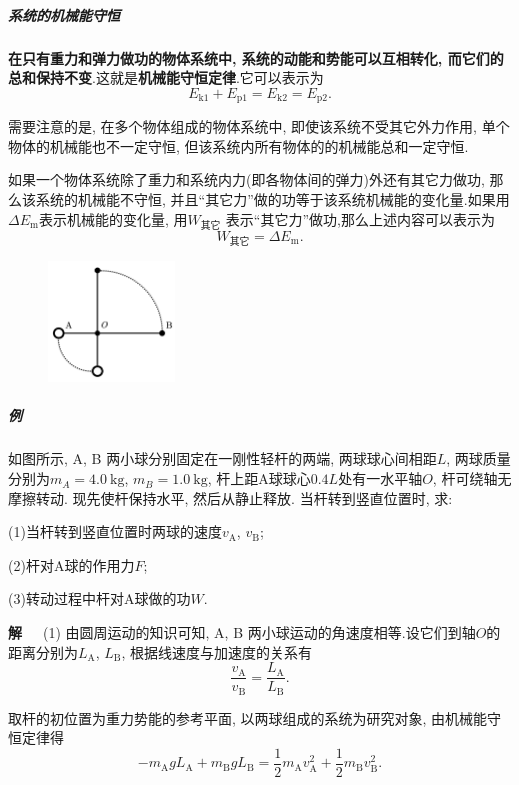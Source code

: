 \documentclass[11pt,a4paper]{ctexart}
\newcounter{exam}[section]
\begin{document}
\subparagraph{系统的机械能守恒}\textbf{在只有重力和弹力做功的物体系统中, 系统的动能和势能可以互相转化,
	而它们的总和保持不变}.这就是\textbf{机械能守恒定律}.它可以表示为
$$E_\mathrm{k1}+E_\mathrm{p1} = E_\mathrm{k2} = E_\mathrm{p2}.$$

需要注意的是, 在多个物体组成的物体系统中, 即使该系统不受其它外力作用,
单个物体的机械能也不一定守恒, 但该系统内所有物体的的机械能总和一定守恒.

如果一个物体系统除了重力和系统内力(即各物体间的弹力)外还有其它力做功, 那么该系统的机械能不守恒,
并且``其它力''做的功等于该系统机械能的变化量.如果用$\Delta E_\mathrm{m}$表示机械能的变化量, 用$W_\text{其它}$
表示``其它力''做功,那么上述内容可以表示为$$W_\text{其它}= \Delta E_\mathrm{m}.$$

\begin{figure}
	\flushright
	\includegraphics[width=0.3\textwidth]{pic/exam_5.6-2.pdf}
	\label{fic13}
\end{figure}

\subparagraph{例\theexam}如图所示, A, B 两小球分别固定在一刚性轻杆的两端, 两球球心间相距$L$, 两球质量分别为$m_A = 4.0\ \mathrm{kg}$,
$m_B = 1.0\ \mathrm{kg}$,
杆上距A球球心$0.4L$处有一水平轴$O$, 杆可绕轴无摩擦转动. 现先使杆保持水平, 然后从静止释放. 当杆转到竖直位置时, 求:

(1)当杆转到竖直位置时两球的速度$v_\mathrm{A}$, $v_\mathrm{B}$;

(2)杆对A球的作用力$F$;

(3)转动过程中杆对A球做的功$W$.

\textbf{解}\ \ \ (1) 由圆周运动的知识可知, A, B 两小球运动的角速度相等.设它们到轴$O$的距离分别为$L_\mathrm{A}$,
$L_\mathrm{B}$, 根据线速度与加速度的关系有$$\frac{v_\mathrm{A}}{v_\mathrm{B}} = \frac{L_\mathrm{A}}{L_\mathrm{B}}.$$
\setlength{\abovedisplayskip}{5pt}
\setlength{\belowdisplayskip}{10pt}

取杆的初位置为重力势能的参考平面, 以两球组成的系统为研究对象, 由机械能守恒定律得
$$-m_\mathrm{A}gL_\mathrm{A}+m_\mathrm{B}gL_\mathrm{B} = \frac12 m_\mathrm{A} v_\mathrm{A}^2 + \frac12 m_\mathrm{B}v_\mathrm{B}^2.$$
\end{document}
